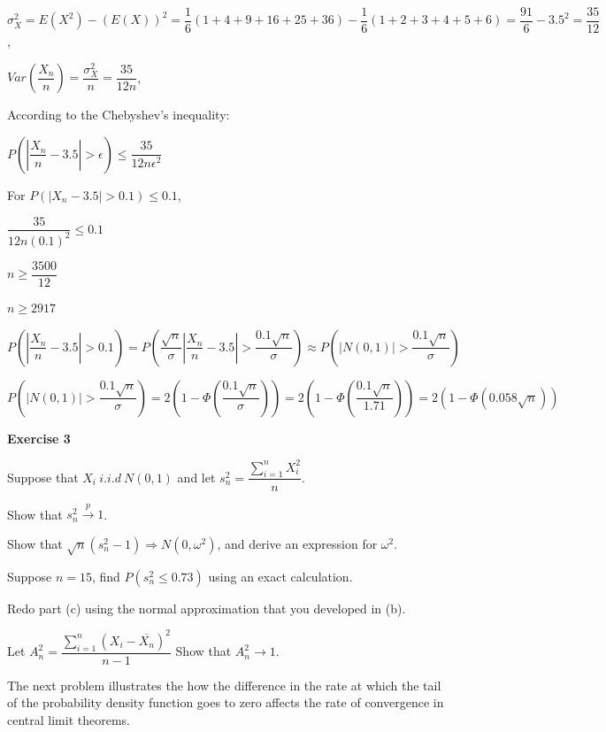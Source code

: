 \documentclass[12pt]{article}
\begin{document}
\begin{list}{()~}{}
\item 

$\sigma_{X}^2=E\left(X^2\right)-\left(E\left(X\right)\right)^2 = \dfrac{1}{6}\left(1 + 4 + 9 + 16 + 25 + 36\right)-\dfrac{1}{6}\left(1+2+3+4+5+6\right) = \dfrac{91}{6}-3.5^2 = \dfrac{35}{12}$,

$Var\left(\dfrac{X_n}{n}\right)=\dfrac{\sigma_{X}^2}{n} = \dfrac{35}{12n}$,

According to the Chebyshev's inequality:

$P\left(\left|\dfrac{X_n}{n}-3.5\right|>\epsilon\right)\leq\dfrac{35}{12n\epsilon^2}$

For $P\left(\left|X_n - 3.5\right| > 0.1\right)\leq0.1$,

$\dfrac{35}{12n\left(0.1\right)^2}\leq 0.1$

$n \geq \dfrac{3500}{12}$

$n \geq 2917$
\item

$P\left(\left|\dfrac{X_n}{n}-3.5\right|> 0.1\right)=P\left(\dfrac{\sqrt{n}}{\sigma}\left|\dfrac{X_n}{n}-3.5\right|> \dfrac{0.1\sqrt{n}}{\sigma}\right)\approx P\left(\left|N\left(0,1\right)\right|>\dfrac{0.1\sqrt{n}}{\sigma}\right)$

$P\left(\left|N\left(0,1\right)\right|>\dfrac{0.1\sqrt{n}}{\sigma}\right) = 2\left(1-\Phi\left(\dfrac{0.1\sqrt{n}}{\sigma}\right)\right) = 2\left(1-\Phi\left(\dfrac{0.1\sqrt{n}}{1.71}\right)\right) = 2\left(1-\Phi\left(0.058\sqrt{n}\right)\right) $

\end{list}

\bigskip

\textbf{Exercise 3}

Suppose that $X_i ~ i.i.d\ N\left(0, 1\right)$ and let $s_n^2 = \dfrac{\sum_{i = 1}^n X_i^2}{n}$.

\begin{list}{()~}{}
\item 
Show that $s_n^2 \xrightarrow{p} 1$.

\item Show that $\sqrt{n}\left(s_n^2 - 1\right) \Rightarrow N \left(0, \omega^2 \right)$, and derive an expression for $\omega^2$.

\item Suppose $n = 15$, find $P\left(s_n^2 \leq 0.73\right)$ using an exact calculation.
\item Redo part (c) using the normal approximation that you developed in (b).
\item Let $A_n^2 = \dfrac{\sum_{i = 1}^n\left(X_i-\overline{X_n}\right)^2}{n-1}$
Show that $A_n^2 \rightarrow 1$.
\end{list}
The next problem illustrates the how the difference in the rate at which the tail of the probability density function goes to zero affects the rate of convergence in central limit theorems.
\medskip		
\end{document}
